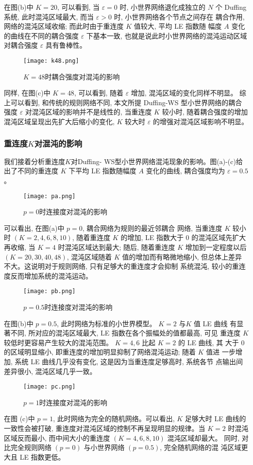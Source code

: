 在图(b)中 $K=20$, 可以看到, 当 $\varepsilon=0$ 时, 小世界网络退化成独立的 $N$ 个 Duffing系统, 此时混沌区域最大,
而当 $\varepsilon>0$ 时, 小世界网络各个节点之间存在 耦合作用, 网络的混沌区域收缩; 而此时由于重连度 $K$ 值较大, 平均 LE 指数随
幅度 $A$ 变化的曲线在不同的耦合强度 $\varepsilon$ 下基本一致, 也就是说此时小世界网络的混沌运动区域对耦合强度
$\varepsilon$ 具有鲁棒性。\par
\begin{figure}[!htbp]
    \centering
    \texttt{[image: k48.png]}
    \caption{$K=48$时耦合强度对混沌的影响}
\end{figure}
同样, 在图(c)中 $K=48$, 可以看到, 随着 $\varepsilon$ 增加, 混沌区域的变化同样不明显。
综上可以看到, 和传统的规则网络不同, 本文所提 Duffing-WS 型小世界网络的耦合强度 $\varepsilon$
对混沌区域的影响并不是线性的, 当重连度 $K$ 较小时, 随着耦合强度的增加混沌区域呈现出先扩大后缩小的变化,
$K$ 较大时 $\varepsilon$ 的增强对混沌区域影响不明显。


\subsubsection{重连度$K$对混沌的影响}
我们接着分析重连度$K$对Duffing- WS型小世界网络混沌现象的影响。图(a)-(c)给出了不同的重连度 $K$ 下平均 LE 指数随幅度 $A$ 变化的曲线, 耦合强度均为 $\varepsilon=0.5$ 。\par
\begin{figure}[!htbp]
    \centering
    \texttt{[image: pa.png]}
    \caption{$p=0$时连接度对混沌的影响}
\end{figure}
可以看出, 在图(a)中 $p=0$, 耦合网络为规则的最近邻耦合 网络, 当重连度 $K$ 较小时 $(K=2,4,6,8,10)$,
随着重连度 $K$ 的增加, LE 指数大于 0 的混沌区域先扩大再收缩, 当 $K=4$ 时混沌区域达到最大; 随后,
随着重连度 $K$ 增加到一定程度以后 $(K=20,30,40,48)$, 混沌区域随着 $K$ 值的增加而有略微地缩小,
但总体上差异不大。这说明对于规则网络, 只有足够大的重连度才会抑制 系统混沌, 较小的重连度反而增加系统的混沌运动。\par
\begin{figure}[!htbp]
    \centering
    \texttt{[image: pb.png]}
    \caption{$p=0.5$时连接度对混沌的影响}
\end{figure}
在图(b)中 $p=0.5$, 此时网络为标准的小世界模型。 $K=2$ 与$K$ 值 LE 曲线 有显著不同, 所对应的混沌区域最大,
LE 指数在各个振幅处的值都最高, 可见 重连度 $K$ 较低时更容易产生较大的混沌范围。 $K=4,6$ 比起 $K=2$ 的 LE 曲线, 其
大于 0 的区域明显缩小, 即重连度的增加明显抑制了网络混沌运动; 随着 $K$ 值进 一步增加, 系统 LE 曲线几乎没有变化,
这是因为当重连度足够高时, 系统各节 点输出间差异很小, 混沌区域几乎一致。\par
\begin{figure}[!htbp]
    \centering
    \texttt{[image: pc.png]}
    \caption{$p=1$时连接度对混沌的影响}
\end{figure}
在图 (c)中 $p=1$, 此时网络为完全的随机网络。可以看出, $K$ 足够大时 LE 曲线的一致性会被打破,
重连度对混沌区域的控制不再呈现明显的规律。当 $K=2$ 时混沌区域反而最小, 而中间大小的重连度 $(K=4,6,8,10)$ 混沌区域却最大。
同时, 对比完全规则网络 $(p=0)$ 与小世界网络 $(p=0.5)$, 完全随机网络的混 沌区域更大且 LE 指数更低。
